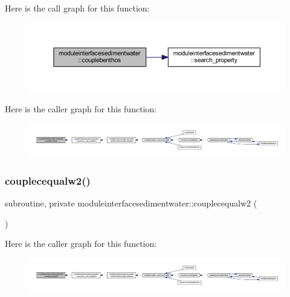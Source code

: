 Here is the call graph for this function\+:\nopagebreak
\begin{figure}[H]
\begin{center}
\leavevmode
\includegraphics[width=350pt]{namespacemoduleinterfacesedimentwater_a0c508a9cfd619780e5dee7d75830b71a_cgraph}
\end{center}
\end{figure}
Here is the caller graph for this function\+:\nopagebreak
\begin{figure}[H]
\begin{center}
\leavevmode
\includegraphics[width=350pt]{namespacemoduleinterfacesedimentwater_a0c508a9cfd619780e5dee7d75830b71a_icgraph}
\end{center}
\end{figure}
\mbox{\label{namespacemoduleinterfacesedimentwater_a853cbc670535f28311263abc42873874}} 
\subsubsection{\texorpdfstring{couplecequalw2()}{couplecequalw2()}}
{\footnotesize\ttfamily subroutine, private moduleinterfacesedimentwater\+::couplecequalw2 (\begin{DoxyParamCaption}{ }\end{DoxyParamCaption})\hspace{0.3cm}{\ttfamily [private]}}

Here is the caller graph for this function\+:\nopagebreak
\begin{figure}[H]
\begin{center}
\leavevmode
\includegraphics[width=350pt]{namespacemoduleinterfacesedimentwater_a853cbc670535f28311263abc42873874_icgraph}
\end{center}
\end{figure}
\mbox{\label{namespacemoduleinterfacesedimentwater_a0dea9565c188c72edf29abf28839a5ac}} 
